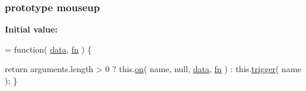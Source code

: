 \subsubsection[{mouseup}]{ {\bf prototype} mouseup}\label{jquery-1_810_82-vsdoc_8js_adb45f5bdff2560ba1f3ca44f5332221a}
{\bfseries Initial value\+:}
\begin{DoxyCode}
= \textcolor{keyword}{function}( \hyperlink{jquery-1_810_82-vsdoc_8js_a609407b3456fdc3c5671a9fc4a226ff7}{data}, \hyperlink{jquery-1_810_82-vsdoc_8js_acef6bdaf6b9b20fdcca1ea86f0902c3b}{fn} ) \{


        \textcolor{keywordflow}{return} arguments.length > 0 ?
            this.\hyperlink{jquery-1_810_82-vsdoc_8js_ae453b412b883f60220d73468ef6c6dbc}{on}( name, null, \hyperlink{jquery-1_810_82-vsdoc_8js_a609407b3456fdc3c5671a9fc4a226ff7}{data}, \hyperlink{jquery-1_810_82-vsdoc_8js_acef6bdaf6b9b20fdcca1ea86f0902c3b}{fn} ) :
            this.\hyperlink{jquery-1_810_82-vsdoc_8js_a2388c4114d5e3e4eab020f973641519c}{trigger}( name );
    \}
\end{DoxyCode}
\hypertarget{jquery-1_810_82-vsdoc_8js_a61213ec31ab21de6b8fbe75332157524}{}
